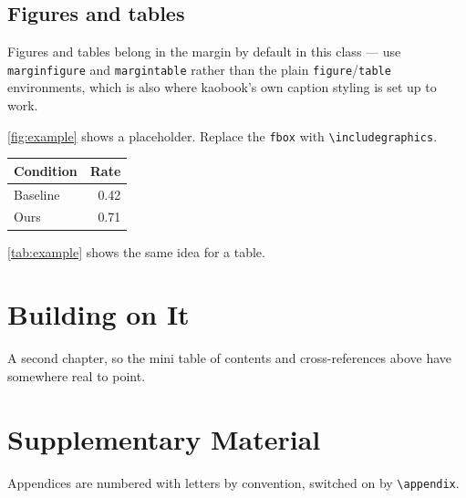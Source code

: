 \documentclass[
	fontsize=10pt, %
	twoside=false, %
	secnumdepth=1, %
]{kaobook}
\begin{document}
\section{Figures and tables}
Figures and tables belong in the margin by default in this class --- use
\texttt{marginfigure} and \texttt{margintable} rather than the plain
\texttt{figure}/\texttt{table} environments, which is also where kaobook's
own caption styling is set up to work.

\begin{marginfigure}
	\centering
	\caption{A caption goes below the figure.}
	\label{fig:example}
\end{marginfigure}

\cref{fig:example} shows a placeholder. Replace the \texttt{fbox} with
\texttt{\textbackslash includegraphics}.

\begin{margintable}
	\centering
	\begin{tabular}{lr}
		\toprule
		Condition & Rate \\
		\midrule
		Baseline & 0.42 \\
		Ours     & 0.71 \\
		\bottomrule
	\end{tabular}
	\caption{A small margin table.}
	\label{tab:example}
\end{margintable}

\cref{tab:example} shows the same idea for a table.

\chapter{Building on It}
\label{ch:next}
A second chapter, so the mini table of contents and cross-references above
have somewhere real to point.


\appendix
\chapter{Supplementary Material}
Appendices are numbered with letters by convention, switched on by
\texttt{\textbackslash appendix}.

\backmatter
{}

\printindex
\end{document}
